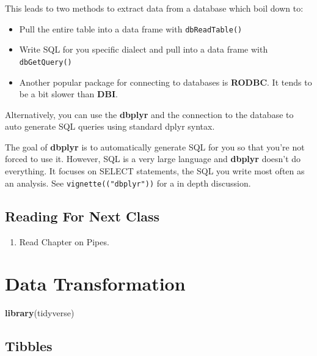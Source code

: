 \documentclass[]{book}
\newenvironment{Shaded}{\begin{snugshade}}{\end{snugshade}}
\newcommand{\KeywordTok}[1]{\textcolor[rgb]{0.13,0.29,0.53}{\textbf{#1}}}
\newcommand{\NormalTok}[1]{#1}
\providecommand{\tightlist}{%
  \setlength{\itemsep}{0pt}\setlength{\parskip}{0pt}}
\newenvironment{rmdblock}[1]
  {\begin{shaded*}
  \begin{itemize}
  \renewcommand{\labelitemi}{
    \raisebox{-.7\height}[0pt][0pt]{
      {\setkeys{Gin}{width=3em,keepaspectratio}\texttt{[image: images/\#1]}}
    }
  }
  \item
  }
  {
  \end{itemize}
  \end{shaded*}
  }
\newenvironment{rmdnote}
  {\begin{rmdblock}{note}}
  {\end{rmdblock}}
\theoremstyle{definition}
\theoremstyle{definition}
\theoremstyle{definition}
\theoremstyle{remark}
\begin{document}
This leads to two methods to extract data from a database which boil
down to:

\begin{itemize}
\tightlist
\item
  Pull the entire table into a data frame with \texttt{dbReadTable()}
\item
  Write SQL for you specific dialect and pull into a data frame with
  \texttt{dbGetQuery()}
\end{itemize}

\begin{rmdnote}
Another popular package for connecting to databases is \textbf{RODBC}.
It tends to be a bit slower than \textbf{DBI}.
\end{rmdnote}

Alternatively, you can use the \textbf{dbplyr} and the connection to the
database to auto generate SQL queries using standard dplyr syntax.

The goal of \textbf{dbplyr} is to automatically generate SQL for you so
that you're not forced to use it. However, SQL is a very large language
and \textbf{dbplyr} doesn't do everything. It focuses on SELECT
statements, the SQL you write most often as an analysis. See
\texttt{vignette(("dbplyr"))} for a in depth discussion.

\hypertarget{reading-for-next-class-2}{%
\section{Reading For Next Class}\label{reading-for-next-class-2}}

\begin{enumerate}
\def\labelenumi{\arabic{enumi}.}
\tightlist
\item
  Read Chapter on Pipes.
\end{enumerate}

\hypertarget{data-transformation}{%
\chapter{Data Transformation}\label{data-transformation}}

\begin{Shaded}
\begin{Highlighting}[]
\KeywordTok{library}\NormalTok{(tidyverse)}
\end{Highlighting}
\end{Shaded}

\hypertarget{tibbles}{%
\section{Tibbles}\label{tibbles}}
\end{document}
